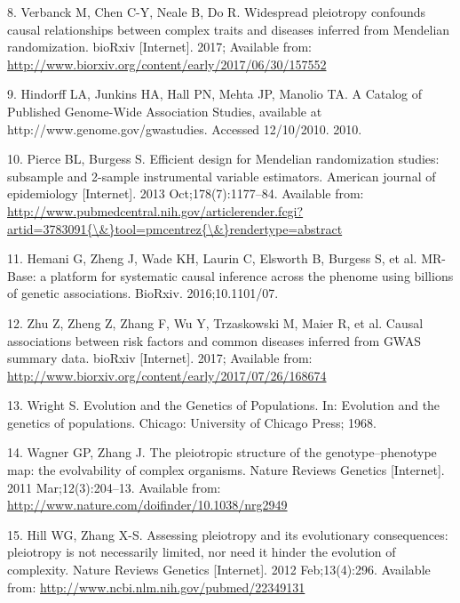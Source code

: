 \documentclass[]{article}
\begin{document}
\hypertarget{ref-Verbanck2017}{}
8. Verbanck M, Chen C-Y, Neale B, Do R. Widespread pleiotropy confounds
causal relationships between complex traits and diseases inferred from
Mendelian randomization. bioRxiv {[}Internet{]}. 2017; Available from:
\url{http://www.biorxiv.org/content/early/2017/06/30/157552}

\hypertarget{ref-Hindorff2010}{}
9. Hindorff LA, Junkins HA, Hall PN, Mehta JP, Manolio TA. A Catalog of
Published Genome-Wide Association Studies, available at
http://www.genome.gov/gwastudies. Accessed 12/10/2010. 2010.

\hypertarget{ref-Pierce2013}{}
10. Pierce BL, Burgess S. Efficient design for Mendelian randomization
studies: subsample and 2-sample instrumental variable estimators.
American journal of epidemiology {[}Internet{]}. 2013
Oct;178(7):1177--84. Available from:
\href{http://www.pubmedcentral.nih.gov/articlerender.fcgi?artid=3783091\%7B/\&\%7Dtool=pmcentrez\%7B/\&\%7Drendertype=abstract}{http://www.pubmedcentral.nih.gov/articlerender.fcgi?artid=3783091\{\textbackslash{}\&\}tool=pmcentrez\{\textbackslash{}\&\}rendertype=abstract}

\hypertarget{ref-Hemani2016}{}
11. Hemani G, Zheng J, Wade KH, Laurin C, Elsworth B, Burgess S, et al.
MR-Base: a platform for systematic causal inference across the phenome
using billions of genetic associations. BioRxiv. 2016;10.1101/07.

\hypertarget{ref-Zhu2017}{}
12. Zhu Z, Zheng Z, Zhang F, Wu Y, Trzaskowski M, Maier R, et al. Causal
associations between risk factors and common diseases inferred from GWAS
summary data. bioRxiv {[}Internet{]}. 2017; Available from:
\url{http://www.biorxiv.org/content/early/2017/07/26/168674}

\hypertarget{ref-Wright1968}{}
13. Wright S. Evolution and the Genetics of Populations. In: Evolution
and the genetics of populations. Chicago: University of Chicago Press;
1968.

\hypertarget{ref-Wagner2011}{}
14. Wagner GP, Zhang J. The pleiotropic structure of the
genotype--phenotype map: the evolvability of complex organisms. Nature
Reviews Genetics {[}Internet{]}. 2011 Mar;12(3):204--13. Available from:
\url{http://www.nature.com/doifinder/10.1038/nrg2949}

\hypertarget{ref-Hill2012a}{}
15. Hill WG, Zhang X-S. Assessing pleiotropy and its evolutionary
consequences: pleiotropy is not necessarily limited, nor need it hinder
the evolution of complexity. Nature Reviews Genetics {[}Internet{]}.
2012 Feb;13(4):296. Available from:
\url{http://www.ncbi.nlm.nih.gov/pubmed/22349131}
\end{document}
